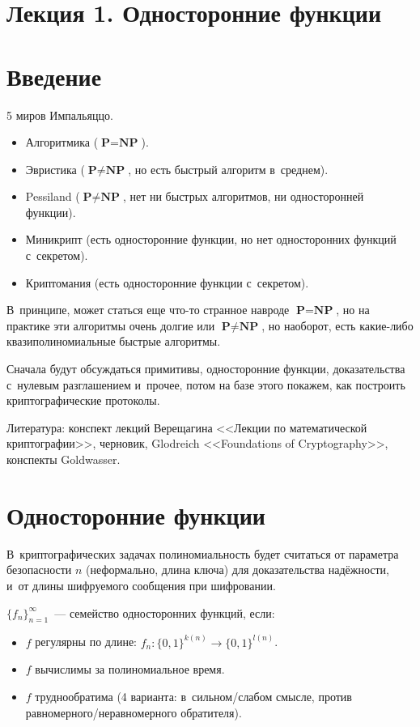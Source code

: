 \documentclass{article}
\begin{document}
\section*{Лекция 1. Односторонние функции}
\resetcntrs

\section{Введение}

5 миров Импальяццо.
\begin{itemize}
	\item Алгоритмика ($\textbf{P} = \textbf{NP}$).
	\item Эвристика ($\textbf{P} \ne \textbf{NP}$, но есть быстрый алгоритм
		в~среднем).
	\item Pessiland ($\textbf{P} \ne \textbf{NP}$, нет ни быстрых алгоритмов, ни
		односторонней функции).
	\item Миникрипт (есть односторонние функции, но нет односторонних функций
		с~секретом).
	\item Криптомания (есть односторонние функции с~секретом).
\end{itemize}

В~принципе, может статься еще что-то странное навроде $\textbf{P} =
\textbf{NP}$, но на практике эти алгоритмы очень долгие или $\textbf{P} \ne
\textbf{NP}$, но наоборот, есть какие-либо квазиполиномиальные быстрые
алгоритмы.

Сначала будут обсуждаться примитивы, односторонние функции, доказательства
с~нулевым разглашением и~прочее, потом на базе этого покажем, как построить
криптографические протоколы.

Литература: конспект лекций Верещагина <<Лекции по математической
криптографии>>, черновик, Glodreich <<Foundations of Cryptography>>, конспекты
Goldwasser.

\section{Односторонние функции}

В~криптографических задачах полиномиальность будет считаться от параметра
безопасности $n$ (неформально, длина ключа) для доказательства надёжности, и~от
длины шифруемого сообщения при шифровании.

\begin{definition}
	$\{f_n\}_{n=1}^{\infty}$~--- семейство односторонних функций, если:
	\begin{itemize}
		\item $f$ регулярны по длине: $f_n: \{0, 1\}^{k(n)} \rightarrow
			\{0, 1\}^{l(n)}$.
		\item $f$ вычислимы за полиномиальное время.
		\item $f$ труднообратима (4 варианта: в~сильном/слабом смысле, против
	равномерного/неравномерного обратителя).
	\end{itemize}
\end{definition}
\end{document}
